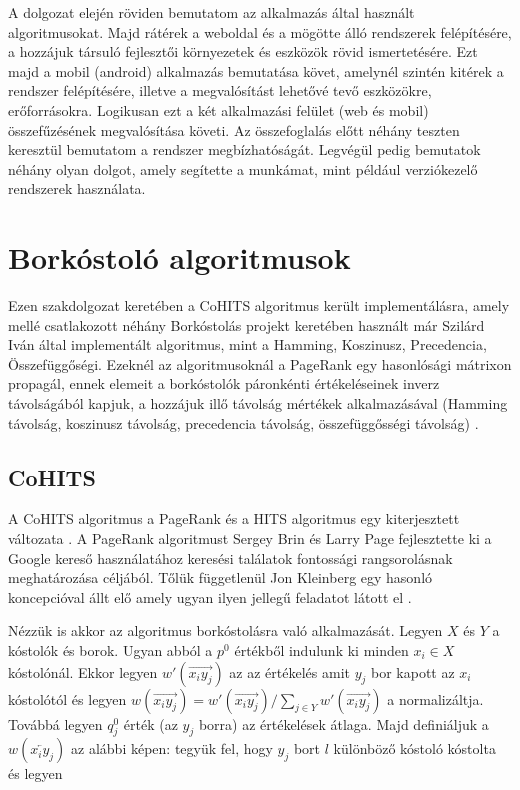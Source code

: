 \documentclass[12pt]{report}
\theoremstyle{definition}
\begin{document}
	A dolgozat elején röviden bemutatom az alkalmazás által használt algoritmusokat. Majd rátérek a weboldal és a mögötte álló rendszerek felépítésére, a hozzájuk társuló fejlesztői környezetek és eszközök rövid ismertetésére. Ezt majd a mobil (android) alkalmazás bemutatása követ, amelynél szintén kitérek a rendszer felépítésére, illetve a megvalósítást lehetővé tevő eszközökre,  erőforrásokra. Logikusan ezt a két alkalmazási felület (web és mobil) összefűzésének megvalósítása követi. Az összefoglalás előtt néhány teszten keresztül bemutatom a rendszer megbízhatóságát. Legvégül pedig bemutatok néhány olyan dolgot, amely segítette a munkámat, mint például verziókezelő rendszerek használata.
	
	\chapter{Borkóstoló algoritmusok}
	
	Ezen szakdolgozat keretében a CoHITS algoritmus került implementálásra, amely mellé csatlakozott néhány Borkóstolás projekt \cite{Borkostolas projekt} keretében használt már Szilárd Iván által implementált algoritmus, mint a Hamming, Koszinusz, Precedencia, Összefüggőségi. Ezeknél az algoritmusoknál a PageRank egy hasonlósági mátrixon propagál, ennek elemeit a borkóstolók páronkénti értékeléseinek inverz távolságából kapjuk, a hozzájuk illő távolság mértékek alkalmazásával (Hamming távolság, koszinusz távolság, precedencia távolság, összefüggősségi távolság) \cite{Borkostolas projekt}.
	
	\section{CoHITS}
	A CoHITS algoritmus a PageRank és a HITS algoritmus egy kiterjesztett változata \cite{CoHITS}. A PageRank algoritmust Sergey Brin és Larry Page fejlesztette ki a Google kereső használatához \cite{PageRank} keresési találatok fontossági rangsorolásnak meghatározása céljából. Tőlük függetlenül Jon Kleinberg egy hasonló koncepcióval állt elő amely ugyan ilyen jellegű feladatot látott el \cite{HITS}.
	
	Nézzük is akkor az algoritmus borkóstolásra való alkalmazását. Legyen $ X $ és $ Y $ a kóstolók és borok. Ugyan abból a $p^0$ értékből indulunk ki minden $x_{i} \in X $ kóstolónál. Ekkor legyen $w'\left(\overrightarrow{x_{i}y_{j}}\right)$ az az értékelés amit $y_j$ bor kapott az $x_i$ kóstolótól és legyen $w\left(\overrightarrow{x_{i}y_{j}}\right)=w'\left(\overrightarrow{x_{i}y_{j}}\right)/\sum_{j \in Y}w'\left(\overrightarrow{x_{i}y_{j}}\right)$ a normalizáltja. Továbbá legyen $q_j^0$ érték (az $y_j$ borra) az értékelések átlaga. Majd definiáljuk a $w\left(\overleftarrow{x_iy_j}\right)$ az alábbi képen: tegyük fel, hogy $y_j$ bort $l$ különböző kóstoló kóstolta és legyen
	
\end{document}

